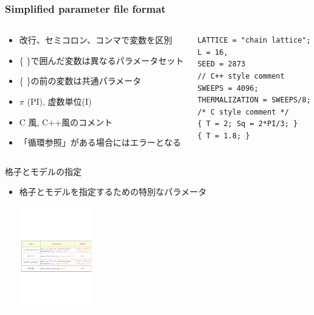 \begin{frame}[t,fragile]
  \frametitle{Simplified parameter file format}
  \begin{columns}[T]
    \begin{column}{.5\textwidth}
      \begin{itemize}
        \item 改行、セミコロン、コンマで変数を区別
        \item \{ \}で囲んだ変数は異なるパラメータセット
        \item \{ \}の前の変数は共通パラメータ
        \item $\pi$ (PI), 虚数単位(I)
        \item C 風, C++風のコメント
        \item 「循環参照」がある場合にはエラーとなる
      \end{itemize}
    \end{column}
    \begin{column}{.5\textwidth}
    \begin{lstlisting}
LATTICE = "chain lattice";
L = 16,
SEED = 2873
// C++ style comment
SWEEPS = 4096;
THERMALIZATION = SWEEPS/8;
/* C style comment */
{ T = 2; Sq = 2*PI/3; }
{ T = 1.8; }
    \end{lstlisting}
    \end{column}
  \end{columns}
\end{frame}

\begin{frame}{格子とモデルの指定}
  \begin{itemize}
  \item 格子とモデルを指定するための特別なパラメータ
  \begin{center}
    \includegraphics[height=4.5cm]{simulation5.pdf}
  \end{center}
  \end{itemize}
\end{frame}

